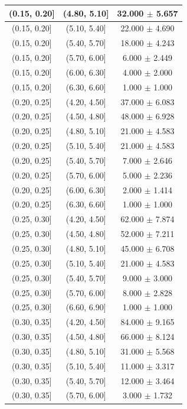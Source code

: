 \begin{longtable}{|c|c|c|}
(0.15, 0.20] & (4.80, 5.10] & 32.000 $\pm$ 5.657 \\ 
\hline
(0.15, 0.20] & (5.10, 5.40] & 22.000 $\pm$ 4.690 \\ 
\hline
(0.15, 0.20] & (5.40, 5.70] & 18.000 $\pm$ 4.243 \\ 
\hline
(0.15, 0.20] & (5.70, 6.00] & 6.000 $\pm$ 2.449 \\ 
\hline
(0.15, 0.20] & (6.00, 6.30] & 4.000 $\pm$ 2.000 \\ 
\hline
(0.15, 0.20] & (6.30, 6.60] & 1.000 $\pm$ 1.000 \\ 
\hline
(0.20, 0.25] & (4.20, 4.50] & 37.000 $\pm$ 6.083 \\ 
\hline
(0.20, 0.25] & (4.50, 4.80] & 48.000 $\pm$ 6.928 \\ 
\hline
(0.20, 0.25] & (4.80, 5.10] & 21.000 $\pm$ 4.583 \\ 
\hline
(0.20, 0.25] & (5.10, 5.40] & 21.000 $\pm$ 4.583 \\ 
\hline
(0.20, 0.25] & (5.40, 5.70] & 7.000 $\pm$ 2.646 \\ 
\hline
(0.20, 0.25] & (5.70, 6.00] & 5.000 $\pm$ 2.236 \\ 
\hline
(0.20, 0.25] & (6.00, 6.30] & 2.000 $\pm$ 1.414 \\ 
\hline
(0.20, 0.25] & (6.30, 6.60] & 1.000 $\pm$ 1.000 \\ 
\hline
(0.25, 0.30] & (4.20, 4.50] & 62.000 $\pm$ 7.874 \\ 
\hline
(0.25, 0.30] & (4.50, 4.80] & 52.000 $\pm$ 7.211 \\ 
\hline
(0.25, 0.30] & (4.80, 5.10] & 45.000 $\pm$ 6.708 \\ 
\hline
(0.25, 0.30] & (5.10, 5.40] & 21.000 $\pm$ 4.583 \\ 
\hline
(0.25, 0.30] & (5.40, 5.70] & 9.000 $\pm$ 3.000 \\ 
\hline
(0.25, 0.30] & (5.70, 6.00] & 8.000 $\pm$ 2.828 \\ 
\hline
(0.25, 0.30] & (6.60, 6.90] & 1.000 $\pm$ 1.000 \\ 
\hline
(0.30, 0.35] & (4.20, 4.50] & 84.000 $\pm$ 9.165 \\ 
\hline
(0.30, 0.35] & (4.50, 4.80] & 66.000 $\pm$ 8.124 \\ 
\hline
(0.30, 0.35] & (4.80, 5.10] & 31.000 $\pm$ 5.568 \\ 
\hline
(0.30, 0.35] & (5.10, 5.40] & 11.000 $\pm$ 3.317 \\ 
\hline
(0.30, 0.35] & (5.40, 5.70] & 12.000 $\pm$ 3.464 \\ 
\hline
(0.30, 0.35] & (5.70, 6.00] & 3.000 $\pm$ 1.732 \\ 

\end{longtable}
